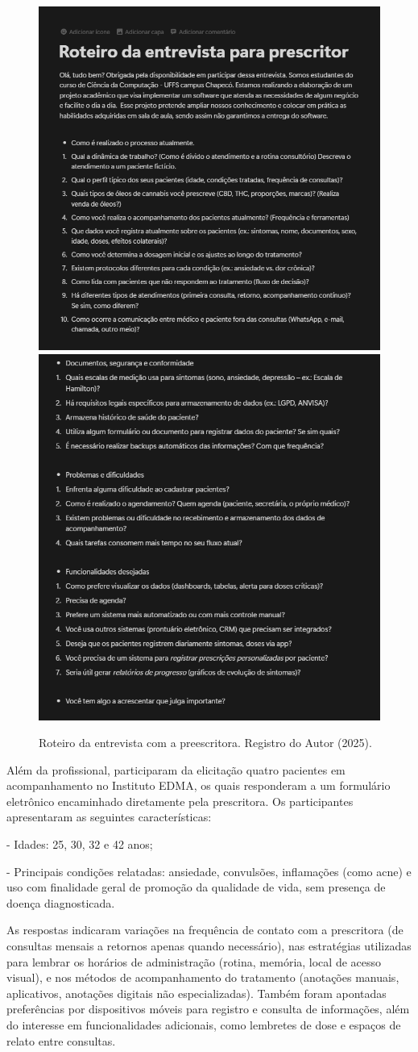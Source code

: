 \href{}{}\documentclass[12pt,portuguese,oneside]{article}
\begin{document}
\begin{figure}[H]
    \centering
    \includegraphics[width=0.4\linewidth]{imagens/roteiro1.png}
    \includegraphics[width=0.4\linewidth]{imagens/roteiro2.png}
    \caption{Roteiro da entrevista com a preescritora. Registro do Autor (2025).}
    \label{fig:roteiro.png}
\end{figure}

Além da profissional, participaram da elicitação quatro pacientes em acompanhamento no Instituto EDMA, os quais responderam a um formulário eletrônico encaminhado diretamente pela prescritora. Os participantes apresentaram as seguintes características:

- Idades: 25, 30, 32 e 42 anos;

- Principais condições relatadas: ansiedade, convulsões, inflamações (como acne) e uso com finalidade geral de promoção da qualidade de vida, sem presença de doença diagnosticada.

As respostas indicaram variações na frequência de contato com a prescritora (de consultas mensais a retornos apenas quando necessário), nas estratégias utilizadas para lembrar os horários de administração (rotina, memória, local de acesso visual), e nos métodos de acompanhamento do tratamento (anotações manuais, aplicativos, anotações digitais não especializadas). Também foram apontadas preferências por dispositivos móveis para registro e consulta de informações, além do interesse em funcionalidades adicionais, como lembretes de dose e espaços de relato entre consultas.
\end{document}
